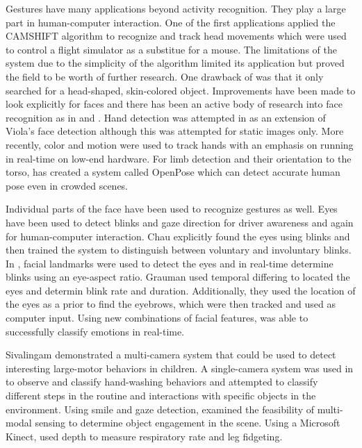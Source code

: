 \documentclass[11pt]{article}
\begin{document}
Gestures have many applications beyond activity recognition. They play a large part in human-computer interaction. One of the first applications\cite{bradski98} applied the CAMSHIFT algorithm to recognize and track head movements which were used to control a flight simulator as a substitue for a mouse. The limitations of the system due to the simplicity of the algorithm limited its application but proved the field to be worth of further research. One drawback of \cite{bradski98} was that it only searched for a head-shaped, skin-colored object. Improvements have been made to look explicitly for faces and there has been an active body of research into face recognition as in \cite{cech2014} and \cite{viola2004}. Hand detection was attempted in \cite{kolsch2004} as an extension of Viola's face detection although this was attempted for static images only. More recently, color and motion were used to track hands with an emphasis on running in real-time on low-end hardware\cite{liu2017}. For limb detection and their orientation to the torso, \cite{cao2016} has created a system called OpenPose which can detect accurate human pose even in crowded scenes.

Individual parts of the face have been used to recognize gestures as well. Eyes have been used to detect blinks and gaze direction for driver awareness and again for human-computer interaction. Chau\cite{chau2005} explicitly found the eyes using blinks and then trained the system to distinguish between voluntary and involuntary blinks. In \cite{soukupova2016}, facial landmarks were used to detect the eyes and in real-time determine blinks using an eye-aspect ratio. Grauman\cite{grauman2003} used temporal differing to located the eyes and determin blink rate and duration. Additionally, they used the location of the eyes as a prior to find the eyebrows, which were then tracked and used as computer input. Using new combinations of facial features, \cite{nguyen2017} was able to successfully classify emotions in real-time.

Sivalingam\cite{sivalingam2012} demonstrated a multi-camera system that could be used to detect interesting large-motor behaviors in children. A single-camera system was used in \cite{fasching2016} to observe and classify hand-washing behaviors and attempted to classify different steps in the routine and interactions with specific objects in the environment. Using smile and gaze detection, \cite{rehg2013} examined the feasibility of multi-modal sensing to determine object engagement in the scene. Using a Microsoft Kinect, \cite{burba2012} used depth to measure respiratory rate and leg fidgeting.
\end{document}
